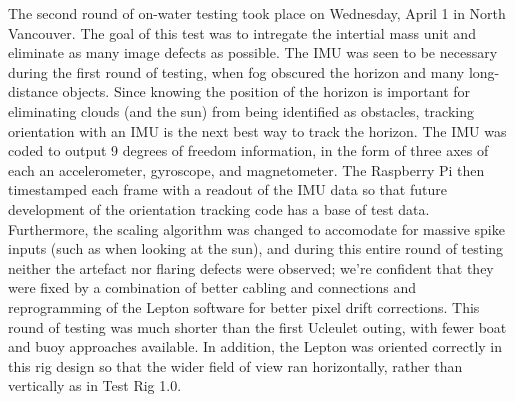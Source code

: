 The second round of on-water testing took place on Wednesday, April 1 in North Vancouver. The goal of this test was to intregate the intertial mass unit and eliminate as many image defects as possible. The IMU was seen to be necessary during the first round of testing, when fog obscured the horizon and many long-distance objects. Since knowing the position of the horizon is important for eliminating clouds (and the sun) from being identified as obstacles, tracking orientation with an IMU is the next best way to track the horizon. The IMU was coded to output 9 degrees of freedom information, in the form of three axes of each an accelerometer, gyroscope, and magnetometer. The Raspberry Pi then timestamped each frame with a readout of the IMU data so that future development of the orientation tracking code has a base of test data. Furthermore, the scaling algorithm was changed to accomodate for massive spike inputs (such as when looking at the sun), and during this entire round of testing neither the artefact nor flaring defects were observed; we're confident that they were fixed by a combination of better cabling and connections and reprogramming of the Lepton software for better pixel drift corrections. This round of testing was much shorter than the first Ucleulet outing, with fewer boat and buoy approaches available. In addition, the Lepton was oriented correctly in this rig design so that the wider field of view ran horizontally, rather than vertically as in Test Rig 1.0.

